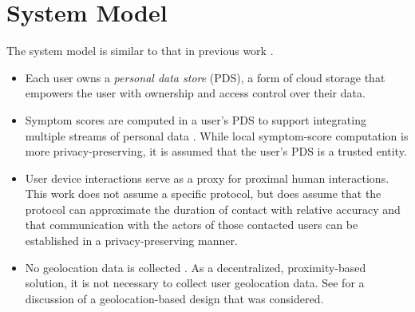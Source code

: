 \section{System Model}\label{sec:system-model}


The system model is similar to that in previous work \citep{Ayday2020, Ayday2021}.
\begin{itemize}
  \item Each user owns a \emph{personal data store} (PDS), a form of cloud storage that empowers the user with ownership and access control over their data.
  \item Symptom scores are computed in a user's PDS to support integrating multiple streams of personal data \citep{Ayday2020}. While local symptom-score computation \citep{Ayday2020, Ayday2021} is more privacy-preserving, it is assumed that the user's PDS is a trusted entity.
  \item User device interactions serve as a proxy for proximal human interactions. This work does not assume a specific protocol, but does assume that the protocol can approximate the duration of contact with relative accuracy and that communication with the actors of those contacted users can be established in a privacy-preserving manner.
  \item No geolocation data is collected \citep{Ayday2020}. As a decentralized, proximity-based solution, it is not necessary to collect user geolocation data. See  for a discussion of a geolocation-based design that was considered.
\end{itemize}
